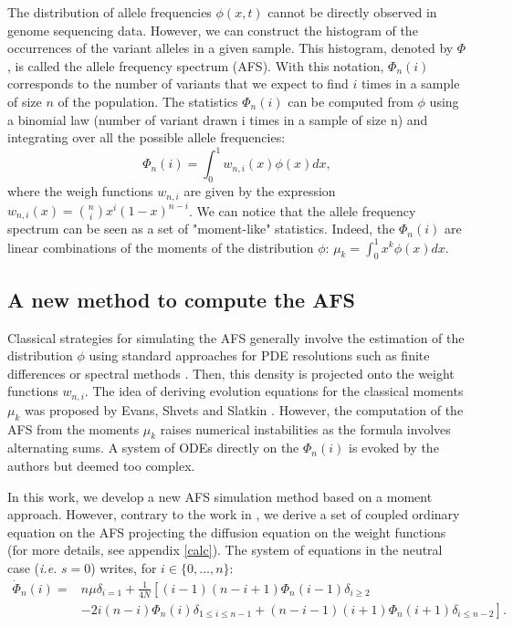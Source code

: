 The distribution of allele frequencies $\phi(x,t)$ cannot be directly observed in genome sequencing data. However, we can construct the histogram of the occurrences of the variant alleles in a given sample. This histogram, denoted by $\Phi$, is called the allele frequency spectrum (AFS). With this notation, $\Phi_n(i)$ corresponds to the number of variants that we expect to find $i$ times in a sample of size $n$ of the population. The statistics $\Phi_n(i)$ can be computed from $\phi$ using a binomial law (number of variant drawn i times in a sample of size n) and integrating over all the possible allele frequencies: 
$$
	 \Phi_n(i) = \int_0^1 w_{n,i}(x) \phi(x) dx,
$$
where the weigh functions $w_{n,i}$ are given by the expression $w_{n,i}(x) = {n\choose i}  x^i (1-x)^{n-i}$.
We can notice that the allele frequency spectrum can be seen as a set of "moment-like" statistics. Indeed, the $\Phi_n(i)$ are linear combinations of the moments of the distribution $\phi$: $\mu_k = \int_0^1 x^k \phi(x)dx$.

\subsection{A new method to compute the AFS}
Classical strategies for simulating the AFS generally involve the estimation of the distribution $\phi$ using standard approaches for PDE resolutions such as finite differences \cite{gutenkunst2009} or spectral methods \cite{lukic2011}. Then, this density is projected onto the weight functions $w_{n,i}$.
The idea of deriving evolution equations for the classical moments $\mu_k$ was proposed by Evans, Shvets and Slatkin \cite{evans2007}. However, the computation of the AFS from the moments $\mu_k$ raises numerical instabilities as the formula involves alternating sums. A system of ODEs directly on the $\Phi_n(i)$ is evoked by the authors but deemed too complex.

In this work, we develop a new AFS simulation method based on a moment approach. However, contrary to the work in \cite{evans2007}, we derive a set of coupled ordinary equation on the AFS projecting the diffusion equation on the weight functions (for more details, see appendix \ref{calc}). The system of equations in the neutral case (\textit{i.e.} $s = 0$) writes, for $i \in \{0,... , n\}$:
\begin{equation}
\begin{split}
\dot \Phi_n(i)=& n\mu  \delta_{i=1} + \frac{1}{4 N} \left[ (i-1)(n-i+1) \Phi_n(i-1)\delta_{i\geq 2} \right.\\
		      & \left.-2i(n-i)\Phi_n(i)\delta_{1\leq i\leq n-1}  + (n-i-1)(i+1)\Phi_n(i+1)\delta_{i\leq n-2} \right].
\end{split}
\label{eq:neutral}
\end{equation}

